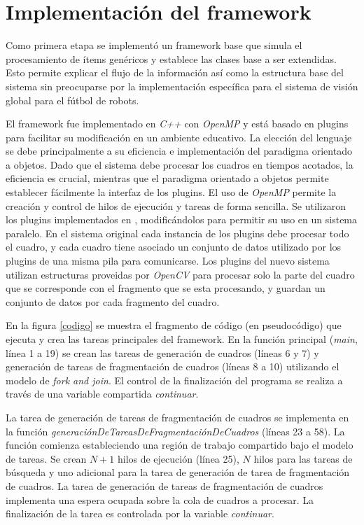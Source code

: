 \section{Implementación del framework}

\label{implementacionFramework}

Como primera etapa se implementó un framework base que simula el procesamiento de
ítems genéricos y establece las clases base a ser extendidas. Esto permite
explicar el flujo de la información así como la estructura base del sistema sin
preocuparse por la implementación específica para el sistema de visión global
para el fútbol de robots.

El framework fue implementado en \emph{C++} con \emph{OpenMP} y está basado en
plugins para facilitar su modificación en un ambiente educativo. La elección del
lenguaje se debe principalmente a su eficiencia e implementación del paradigma
orientado a objetos. Dado que el sistema debe procesar los cuadros en tiempos
acotados, la eficiencia es crucial, mientras que el paradigma orientado a
objetos permite establecer fácilmente la interfaz de los plugins. El uso de
\emph{OpenMP} permite la creación y control de hilos de ejecución y tareas de
forma sencilla. Se utilizaron los plugins implementados en \cite{torres2014},
modificándolos para permitir su uso en un sistema paralelo. En el sistema
original cada instancia de los plugins debe procesar todo el cuadro, y cada
cuadro tiene asociado un conjunto de datos utilizado por los plugins de una
misma pila para comunicarse. Los plugins del nuevo sistema utilizan estructuras
proveidas por \emph{OpenCV} para procesar solo la parte del cuadro que se
corresponde con el fragmento que se esta procesando, y guardan un conjunto de
datos por cada fragmento del cuadro.

En la figura \ref{codigo} se muestra el fragmento de código (en pseudocódigo)
que ejecuta y crea las tareas principales del framework. En la función principal
(\emph{main}, línea 1 a 19) se crean las tareas de generación de cuadros (líneas
6 y 7) y generación de tareas de fragmentación de cuadros (líneas 8 a 10)
utilizando el modelo de \emph{fork and join}. El control de la finalización del
programa se realiza a través de una variable compartida \emph{continuar}.

La tarea de generación de tareas de fragmentación de cuadros se implementa en la
función \emph{generaciónDeTareasDeFragmentaciónDeCuadros} (líneas 23 a 58). La
función comienza estableciendo una región de trabajo compartido bajo el modelo
de tareas. Se crean $N+1$ hilos de ejecución (línea 25), $N$ hilos para las
tareas de búsqueda y uno adicional para la tarea de generación de tarea de
fragmentación de cuadros. La tarea de generación de tareas de fragmentación de
cuadros implementa una espera ocupada sobre la cola de cuadros a procesar. La
finalización de la tarea es controlada por la variable \emph{continuar}.

